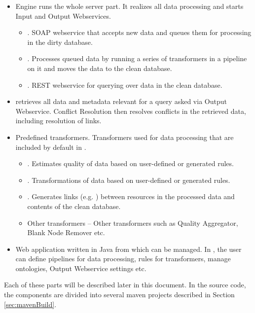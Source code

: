 \begin{itemize}
	\item {}
		Engine runs the whole server part. It realizes all data processing and starts Input and Output Webservices.

		\begin{itemize}
			\item {}. SOAP webservice that accepts new data and queues them for processing in the dirty database.
			\item {}. Processes queued data by running a series of transformers in a pipeline on it and moves the data to the clean database.
			\item {}. REST webservice for querying over data in the clean database.
		\end{itemize}
	\item {}
		\QE retrieves all data and metadata relevant for a query asked via Output Webservice. Conflict Resolution then resolves conflicts in the retrieved data, including resolution of  links.
	\item Predefined transformers.
		Transformers used for data processing that are included by default in \odcs.
		\begin{itemize}
			\item {}. Estimates quality of data based on user-defined or generated rules.
			\item {}. Transformations of data based on user-defined or generated rules.
			\item {}. Generates links (e.g. ) between resources in the processed data and contents of the clean database.
			\item Other transformers -- Other transformers such as Quality Aggregator, Blank Node Remover etc.
		\end{itemize}
	\item {}
		Web application written in Java from which \odcs can be managed. In \FE, the user can define pipelines for data processing, rules for transformers, manage ontologies, Output Webservice settings etc.
\end{itemize}

Each of these parts will be described later in this document. In the source code, the components are divided into several maven projects described in Section \ref{sec:mavenBuild}.

